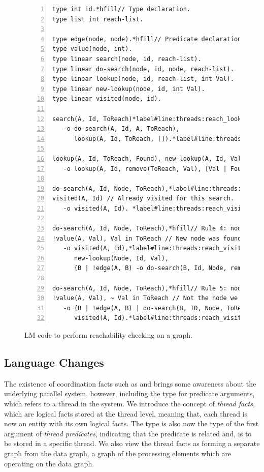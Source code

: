 \begin{figure}[h]
\begin{Verbatim}[numbers=left,fontsize=\codesize,commandchars=*\#\&]
type int id.*hfill// Type declaration.
type list int reach-list.

type edge(node, node).*hfill// Predicate declaration.
type value(node, int).
type linear search(node, id, reach-list).
type linear do-search(node, id, node, reach-list).
type linear lookup(node, id, reach-list, int Val).
type linear new-lookup(node, id, int Val).
type linear visited(node, id).

search(A, Id, ToReach)*label#line:threads:reach_lookup1&*hfill// Rule 1: initialize search.
   -o do-search(A, Id, A, ToReach),
      lookup(A, Id, ToReach, []).*label#line:threads:reach_lookup2&

lookup(A, Id, ToReach, Found), new-lookup(A, Id, Val)*hfill// Rule 2: new reachable node found.
   -o lookup(A, Id, remove(ToReach, Val), [Val | Found]).

do-search(A, Id, Node, ToReach),*label#line:threads:reach_visit1&*hfill// Rule 3: node has already seen this search.
visited(A, Id) // Already visited for this search.
   -o visited(A, Id). *label#line:threads:reach_visit2&

do-search(A, Id, Node, ToReach),*hfill// Rule 4: node found and propagate search.
!value(A, Val), Val in ToReach // New node was found.
   -o visited(A, Id),*label#line:threads:reach_visit_visited1&
      new-lookup(Node, Id, Val),
      {B | !edge(A, B) -o do-search(B, Id, Node, remove(ToReach, Val))}.*label#line:threads:reach_propagate&

do-search(A, Id, Node, ToReach),*hfill// Rule 5: node not found and propagate search.
!value(A, Val), ~ Val in ToReach // Not the node we are looking for.
   -o {B | !edge(A, B) | do-search(B, ID, Node, ToReach)},*label#line:threads:reach_propagate2&
      visited(A, Id).*label#line:threads:reach_visit_visited2&
\end{Verbatim}

\caption{LM code to perform reachability checking on a graph.}
\label{code:threads:reach_simple}
\end{figure}

\subsection{Language Changes}

The existence of coordination facts such as  and
 brings some awareness about the underlying parallel system,
however, including the type  for predicate arguments, which refers
to a thread in the system. We introduce the concept of \emph{thread facts},
which are logical facts stored at the thread level, meaning that, each thread
is now an entity with its own logical facts. The type  is also now
the type of the first argument of \emph{thread predicates}, indicating that the
predicate is related and, is to be stored in a specific thread. We also view
the thread facts as forming a separate graph from the data graph, a graph of
the processing elements which are operating on the data graph.


